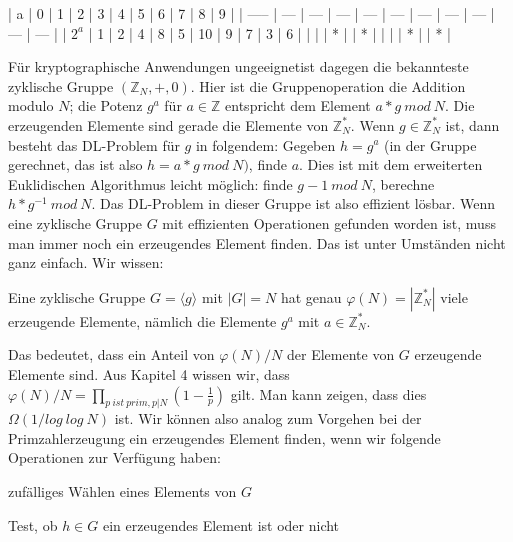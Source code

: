 \documentclass[a4paper]{article}
\begin{document}
\begin{multicols}{3}
        | a     | 0   | 1   | 2   | 3   | 4   | 5   | 6   | 7   | 8   | 9   |
        | ----- | --- | --- | --- | --- | --- | --- | --- | --- | --- | --- |
        | $2^a$ | 1   | 2   | 4   | 8   | 5   | 10  | 9   | 7   | 3   | 6   |
        |       |     | *   |     | *   |     |     |     | *   |     | *   |

        Für kryptographische Anwendungen ungeeignetist dagegen die bekannteste zyklische Gruppe $(\mathbb{Z}_N,+,0)$. Hier ist die Gruppenoperation die Addition modulo $N$; die Potenz $g^a$ für $a\in\mathbb{Z}$ entspricht dem Element $a*g\ mod\ N$. Die erzeugenden Elemente sind gerade die Elemente von $\mathbb{Z}^*_N$. Wenn $g\in\mathbb{Z}^*_N$ ist, dann besteht das DL-Problem für $g$ in folgendem: Gegeben $h=g^a$ (in der Gruppe gerechnet, das ist also $h=a*g\ mod\ N)$, finde $a$. Dies ist mit dem erweiterten Euklidischen Algorithmus leicht möglich: finde $g-1\ mod\ N$, berechne $h*g^{-1}\ mod\ N$. Das DL-Problem in dieser Gruppe ist also effizient lösbar.
        Wenn eine zyklische Gruppe $G$ mit effizienten Operationen gefunden worden ist, muss man immer noch ein erzeugendes Element finden. Das ist unter Umständen nicht ganz einfach. Wir wissen:
        \begin{itemize*}
            \item Eine zyklische Gruppe $G=\langle g\rangle $ mit $|G|=N$ hat genau $\varphi(N) = |\mathbb{Z}^*_N|$ viele erzeugende Elemente, nämlich die Elemente $g^a$ mit $a\in\mathbb{Z}^*_N$.
        \end{itemize*}

        Das bedeutet, dass ein Anteil von $\varphi(N)/N$ der Elemente von $G$ erzeugende Elemente sind. Aus Kapitel 4 wissen wir, dass $\varphi(N)/N=\prod_{p\ ist\ prim, p|N}(1-\frac{1}{p})$ gilt. Man kann zeigen, dass dies $\Omega(1/log\ log\ N)$ ist. Wir können also analog zum Vorgehen bei der Primzahlerzeugung ein erzeugendes Element finden, wenn wir folgende Operationen zur Verfügung haben:
        \begin{itemize*}
            \item  zufälliges Wählen eines Elements von $G$
            \item  Test, ob $h\in G$ ein erzeugendes Element ist oder nicht
        \end{itemize*}


\end{multicols}
\end{document}
